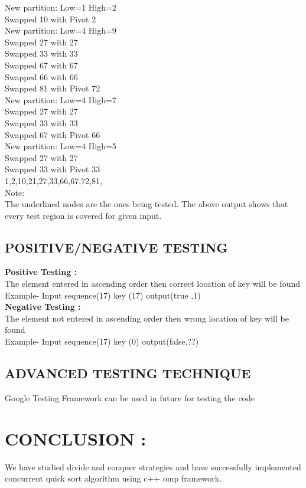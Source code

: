 \documentclass[10pt,a4paper]{article}
\begin{document}
			\noindent
			New partition: Low=1 High=2\\
			Swapped 10 with Pivot 2\\
			
			\noindent
			New partition: Low=4 High=9\\
			Swapped 27 with 27\\
			Swapped 33 with 33\\
			Swapped 67 with 67\\
			Swapped 66 with 66\\
			Swapped 81 with Pivot 72\\
			
			\noindent
			New partition: Low=4 High=7\\
			Swapped 27 with 27\\
			Swapped 33 with 33\\
			Swapped 67 with Pivot 66\\
			
			\noindent
			New partition: Low=4 High=5\\
			Swapped 27 with 27\\
			Swapped 33 with Pivot 33\\
			
			1,2,10,21,27,33,66,67,72,81,\\
			Note: \\
			The underlined nodes are the ones being tested.
			The above output shows that every test region is covered for given input.\\ 
			
			
			\subsection{ POSITIVE/NEGATIVE TESTING }
			
			\textbf{Positive Testing :}\\
			The element entered in ascending order then correct location of key will be found\\ 
			Example- Input  sequence(17)       key (17)         output(true ,1)\\ 
			
			\textbf{ Negative Testing :}\\
			The element  not entered in ascending order then wrong location of key will be found\\ 
			Example- Input  sequence(17)       key (0)         output(false,??)\\ 
			
			\subsection{ADVANCED TESTING TECHNIQUE}
			Google Testing Framework can be used in future for testing the code
			
\section{CONCLUSION : }
	We have studied divide and conquer strategies and have successfully implemented concurrent quick sort algorithm using c++ omp framework.
\end{document}
